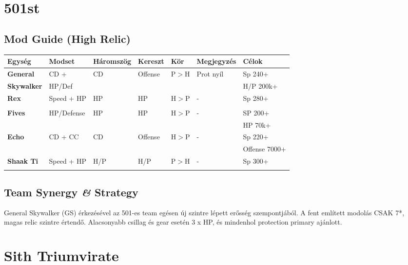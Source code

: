 \documentclass[11pt]{report}
\begin{document}

\chapter{501st}
\section{Mod Guide (High Relic)}
\begin{center}
    \begin{tabular}{|l | l | l | l | l | l | l |}
        \hline
        Egység & Modset & Háromszög & Kereszt & Kör & Megjegyzés & Célok\\ \hline
        \textbf{General} & CD + & CD & Offense & P$>$H & Prot nyíl & Sp 240+\\
        \textbf{Skywalker} & HP/Def &  &  &  &  & H/P 200k+\\ \hline        
        \textbf{Rex} & Speed + HP & HP & HP & H$>$P & - & Sp 280+\\
        &  &  &  &  &  & \\ \hline
        \textbf{Fives} & HP/Defense & HP & HP & H$>$P & - & SP 200+\\
        &  &  &  &  &  & HP 70k+\\ \hline
        \textbf{Echo} & CD + CC & CD & Offense & H$>$P & - & Sp 220+\\
        &  &  &  &  &  & Offense 7000+\\ \hline
        \textbf{Shaak Ti} & Speed + HP& H/P & H/P & P$>$H & - & Sp 300+\\
        &  &  &  &  &  & \\ \hline
    \end{tabular}
\end{center}
\section{Team Synergy \textit{\&} Strategy}
General Skywalker (GS) érkezésével az 501-es team egésen új szintre lépett erősség szempontjából. A fent említett modolás CSAK 7*, magas relic szintre értendő. Alacsonyabb csillag és gear esetén 3 x HP, és mindenhol protection primary ajánlott.


\chapter{Sith Triumvirate}
\end{document}
